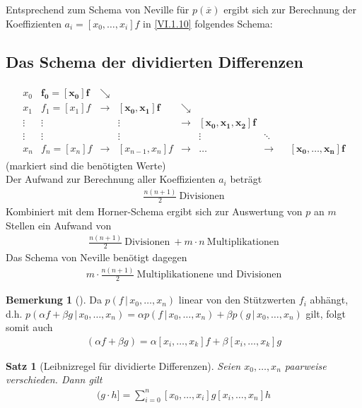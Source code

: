 \documentclass[ngerman,fontsize=11pt, paper=a4, parskip=half, titlepage=true, toc=bib]{scrbook}
\theoremstyle{definition}
\newtheorem{Bem}[Def]{Bemerkung}	%
\theoremstyle{plain}
\newtheorem{Satz}[Def]{Satz}		%
\newcommand{\subsectione}[1]{\addtocounter{Def}{1}\subsection{#1}}
\newenvironment{Satze}[1][]{ %
  \begin{Satz}[#1]
  }
  {
  \end{Satz}
  \addtocounter{subsection}{1}
}
\newenvironment{Beme}[1][]{ %
  \begin{Bem}[#1]
  }
  {
  \end{Bem}
  \addtocounter{subsection}{1}
}
\begin{document}
Entsprechend zum Schema von Neville für $p(\overline{x})$
ergibt sich zur Berechnung der Koeffizienten $a_i=[x_0,\dots,x_i]f$
in \eqref{VI.1.10} folgendes Schema:

\subsectione{Das Schema der dividierten Differenzen}
 \begin{gather*}
   \begin{array}{ccccccccc}
          x_0 & \boldsymbol{f_0=[x_0]f} & \searrow\\
          x_1 & f_1=[x_1]f& \rightarrow &\boldsymbol{ [x_0,x_1]f}&\searrow \\
          \vdots&\vdots &&\vdots &\rightarrow & \boldsymbol{[x_0,x_1,x_2]f}\\
          \vdots&\vdots &&\vdots &&\vdots&\ddots\\
          x_n& f_n=[x_n]f &\rightarrow&[x_{n-1},x_n]f&\rightarrow &
          \dots &\rightarrow && \boldsymbol{[x_0,\dots,x_n]f}
   \end{array}
 \end{gather*}
(markiert sind die benötigten Werte)\\
Der Aufwand zur Berechnung aller Koeffizienten $a_i$ beträgt
\begin{gather*}
  \frac{n(n+1)}{2} ~\text{Divisionen}
\end{gather*}
Kombiniert mit dem Horner-Schema ergibt sich
zur Auswertung von $p$ an $m$ Stellen ein Aufwand von
\begin{gather*}
  \frac{n(n+1)}{2} ~\text{Divisionen}
  ~+m\cdot n   ~\text{Multiplikationen}
\end{gather*}
Das Schema von Neville benötigt dagegen
\begin{gather*}
  m\cdot\frac{n(n+1)}{2} ~\text{Multiplikationene und Divisionen}
\end{gather*}

\begin{Beme}
  Da $p(f\,|\, x_0,\dots, x_n)$ linear von den Stützwerten $f_i$
  abhängt,
  d.h. $p(\alpha f+\beta g\,|\, x_0,\dots, x_n)= 
  \alpha p(f\,|\, x_0,\dots, x_n)+\beta p(g\,|\, x_0,\dots, x_n)$
  gilt, folgt somit auch
  \begin{gather*}
    [x_i,\dots, x_k](\alpha f+\beta g)
    =  \alpha [x_i,\dots, x_k]f+\beta [x_i,\dots, x_k]g 
  \end{gather*}
\end{Beme}


\begin{Satze}[Leibnizregel für dividierte Differenzen]\label{6.1.10}
  Seien $x_0,\dots, x_n$ paarweise verschieden. Dann gilt
  \begin{gather}
    [x_0,\dots, x_n] (g\cdot h] = \sum_{i=0}^{n}[x_0,\dots,x_i]g[x_i,\dots,x_n]h
    \label{VI.1.14}
  \end{gather}
\end{Satze}
\end{document}
